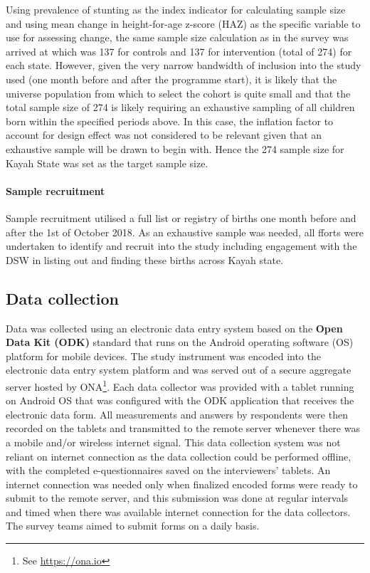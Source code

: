 \documentclass[12pt,a4paper]{article}
\let\oldparagraph\paragraph
\renewcommand{\paragraph}[1]{\oldparagraph{#1}\mbox{}}
\let\rmarkdownfootnote\footnote%
\def\footnote{\protect\rmarkdownfootnote}
\begin{document}
Using prevalence of stunting as the index indicator for calculating sample size and using mean change in height-for-age z-score (HAZ) as the specific variable to use for assessing change, the same sample size calculation as in the survey was arrived at which was 137 for controls and 137 for intervention (total of 274) for each state.
However, given the very narrow bandwidth of inclusion into the study used (one month before and after the programme start), it is likely that the universe population from which to select the cohort is quite small and that the total sample size of 274 is likely requiring an exhaustive sampling of all children born within the specified periods above. In this case, the inflation factor to account for design effect was not considered to be relevant given that an exhaustive sample will be drawn to begin with. Hence the 274 sample size for Kayah State was set as the target sample size.

\hypertarget{sample-recruitment}{%
\paragraph{Sample recruitment}\label{sample-recruitment}}

Sample recruitment utilised a full list or registry of births one month before and after the 1st of October 2018. As an exhaustive sample was needed, all fforts were undertaken to identify and recruit into the study including engagement with the DSW in listing out and finding these births across Kayah state.

\hypertarget{data-collection}{%
\subsection{Data collection}\label{data-collection}}

Data was collected using an electronic data entry system based on the \textbf{Open Data Kit (ODK)} standard that runs on the Android operating software (OS) platform for mobile devices. The study instrument was encoded into the electronic data entry system platform and was served out of a secure aggregate server hosted by ONA\footnote{See \url{https://ona.io}}. Each data collector was provided with a tablet running on Android OS that was configured with the ODK application that receives the electronic data form. All measurements and answers by respondents were then recorded on the tablets and transmitted to the remote server whenever there was a mobile and/or wireless internet signal. This data collection system was not reliant on internet connection as the data collection could be performed offline, with the completed e-questionnaires saved on the interviewers' tablets. An internet connection was needed only when finalized encoded forms were ready to submit to the remote server, and this submission was done at regular intervals and timed when there was available internet connection for the data collectors. The survey teams aimed to submit forms on a daily basis.
\end{document}
